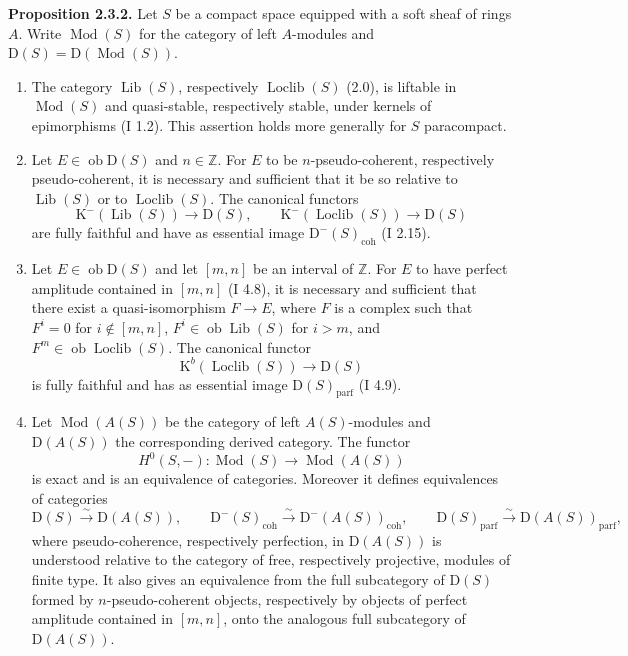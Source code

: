 \documentclass[11pt]{article}
\providecommand{\Mod}{\operatorname{Mod}}
\providecommand{\Lib}{\operatorname{Lib}}
\providecommand{\Loclib}{\operatorname{Loclib}}
\providecommand{\Ob}{\operatorname{ob}}
\providecommand{\coh}{\operatorname{coh}}
\providecommand{\parf}{\operatorname{parf}}
\begin{document}
\textbf{Proposition 2.3.2.} Let $S$ be a compact space equipped with a soft sheaf of rings $A$. Write $\Mod(S)$ for the category of left $A$-modules and $\mathrm D(S)=\mathrm D(\Mod(S))$.
\begin{enumerate}[label=\alph*)]
\item The category $\Lib(S)$, respectively $\Loclib(S)$ (2.0), is liftable in $\Mod(S)$ and quasi-stable, respectively stable, under kernels of epimorphisms (I 1.2). This assertion holds more generally for $S$ paracompact.
\item Let $E\in\Ob\mathrm D(S)$ and $n\in\mathbb Z$. For $E$ to be $n$-pseudo-coherent, respectively pseudo-coherent, it is necessary and sufficient that it be so relative to $\Lib(S)$ or to $\Loclib(S)$. The canonical functors
\[
\mathrm K^{-}(\Lib(S))\longrightarrow \mathrm D(S),
\qquad
\mathrm K^{-}(\Loclib(S))\longrightarrow \mathrm D(S)
\]
are fully faithful and have as essential image $\mathrm D^{-}(S)_{\coh}$ (I 2.15).
\item Let $E\in\Ob\mathrm D(S)$ and let $[m,n]$ be an interval of $\mathbb Z$. For $E$ to have perfect amplitude contained in $[m,n]$ (I 4.8), it is necessary and sufficient that there exist a quasi-isomorphism $F\to E$, where $F$ is a complex such that $F^i=0$ for $i\notin[m,n]$, $F^i\in\Ob\Lib(S)$ for $i>m$, and $F^m\in\Ob\Loclib(S)$. The canonical functor
\[
\mathrm K^b(\Loclib(S))\longrightarrow \mathrm D(S)
\]
is fully faithful and has as essential image $\mathrm D(S)_{\parf}$ (I 4.9).
\item Let $\Mod(A(S))$ be the category of left $A(S)$-modules and $\mathrm D(A(S))$ the corresponding derived category. The functor
\[
H^0(S,-):\Mod(S)\longrightarrow\Mod(A(S))
\]
is exact and is an equivalence of categories. Moreover it defines equivalences of categories
\[
\mathrm D(S)\xrightarrow{\sim}\mathrm D(A(S)),\qquad
\mathrm D^{-}(S)_{\coh}\xrightarrow{\sim}\mathrm D^{-}(A(S))_{\coh},\qquad
\mathrm D(S)_{\parf}\xrightarrow{\sim}\mathrm D(A(S))_{\parf},
\]
where pseudo-coherence, respectively perfection, in $\mathrm D(A(S))$ is understood relative to the category of free, respectively projective, modules of finite type. It also gives an equivalence from the full subcategory of $\mathrm D(S)$ formed by $n$-pseudo-coherent objects, respectively by objects of perfect amplitude contained in $[m,n]$, onto the analogous full subcategory of $\mathrm D(A(S))$.
\end{enumerate}
\end{document}
